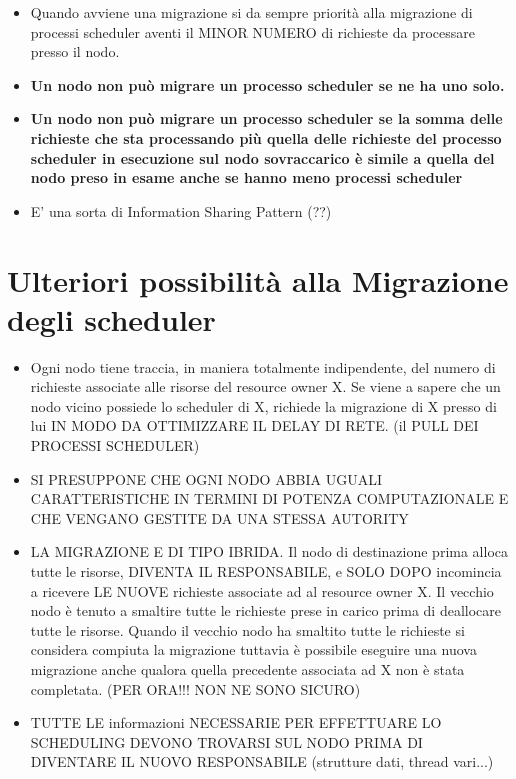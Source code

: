 \documentclass[10pt,a4paper]{article}
\begin{document}
\begin{itemize}
\item Quando avviene una migrazione si da sempre priorità alla migrazione di processi scheduler aventi il MINOR NUMERO di richieste da processare presso il nodo. 

\item \textbf{Un nodo non può migrare un processo scheduler se ne ha uno solo.}

\item \textbf{Un nodo non può migrare un processo scheduler se la somma delle richieste che sta processando più quella delle richieste del processo scheduler in esecuzione sul nodo sovraccarico è simile a quella del nodo preso in esame anche se hanno meno processi scheduler}

\item E' una sorta di Information Sharing Pattern (??)
\end{itemize}

\section{Ulteriori possibilità alla Migrazione degli scheduler}

\begin{itemize}
\item Ogni nodo tiene traccia, in maniera totalmente indipendente, del numero di richieste 
associate alle risorse del resource owner X. Se viene a sapere che un nodo vicino possiede lo scheduler di X, richiede la migrazione di X presso di lui IN MODO DA OTTIMIZZARE IL DELAY DI RETE. (il PULL DEI PROCESSI SCHEDULER)

\item SI PRESUPPONE CHE OGNI NODO ABBIA UGUALI CARATTERISTICHE IN TERMINI DI POTENZA COMPUTAZIONALE E CHE VENGANO GESTITE DA UNA STESSA AUTORITY

\item LA MIGRAZIONE E DI TIPO IBRIDA. Il nodo di destinazione prima alloca tutte le risorse, DIVENTA IL RESPONSABILE, e SOLO DOPO incomincia a ricevere LE NUOVE richieste associate ad al resource owner X. Il vecchio nodo è tenuto a smaltire tutte le richieste prese in carico prima di deallocare tutte le risorse. Quando il vecchio nodo ha smaltito tutte le richieste si considera compiuta la migrazione tuttavia è possibile eseguire una nuova migrazione anche qualora quella precedente associata ad X non è stata completata. (PER ORA!!! NON NE SONO SICURO)

\item TUTTE LE informazioni NECESSARIE PER EFFETTUARE LO SCHEDULING DEVONO TROVARSI SUL NODO PRIMA DI DIVENTARE IL NUOVO RESPONSABILE (strutture dati, thread vari...)
\end{itemize}
\end{document}
